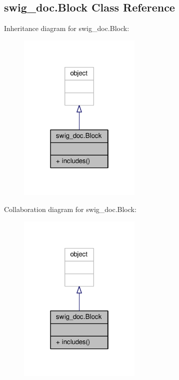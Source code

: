 \subsection{swig\+\_\+doc.\+Block Class Reference}
\label{classswig__doc_1_1Block}


Inheritance diagram for swig\+\_\+doc.\+Block\+:
\nopagebreak
\begin{figure}[H]
\begin{center}
\leavevmode
\includegraphics[width=166pt]{d6/d0a/classswig__doc_1_1Block__inherit__graph}
\end{center}
\end{figure}


Collaboration diagram for swig\+\_\+doc.\+Block\+:
\nopagebreak
\begin{figure}[H]
\begin{center}
\leavevmode
\includegraphics[width=166pt]{d7/d61/classswig__doc_1_1Block__coll__graph}
\end{center}
\end{figure}
